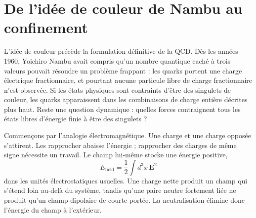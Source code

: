 \begin{classroomqa}
\end{classroomqa}

\begin{classroomqa}
\end{classroomqa}

\section{De l’idée de couleur de Nambu au confinement}

L’idée de couleur précède la formulation définitive de la QCD. Dès les années 1960, Yoichiro Nambu avait compris qu’un nombre quantique caché à trois valeurs pouvait résoudre un problème frappant : les quarks portent une charge électrique fractionnaire, et pourtant aucune particule libre de charge fractionnaire n’est observée. Si les états physiques sont contraints d’être des singulets de couleur, les quarks apparaissent dans les combinaisons de charge entière décrites plus haut. Reste une question dynamique : quelles forces contraignent tous les états libres d’énergie finie à être des singulets ?

Commençons par l’analogie électromagnétique. Une charge et une charge opposée s’attirent. Les rapprocher abaisse l’énergie ; rapprocher des charges de même signe nécessite un travail. Le champ lui-même stocke une énergie positive,
\begin{equation}
E_{\mathrm{field}}
=\frac12\int d^3x\,\boldsymbol E^2
\end{equation}
dans les unités électrostatiques usuelles. Une charge nette produit un champ qui s’étend loin au-delà du système, tandis qu’une paire neutre fortement liée ne produit qu’un champ dipolaire de courte portée. La neutralisation élimine donc l’énergie du champ à l’extérieur.

